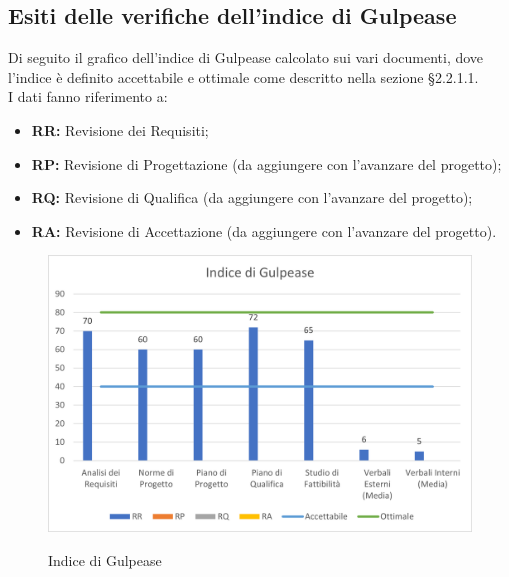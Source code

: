 \subsection{Esiti delle verifiche dell'indice di Gulpease}
Di seguito il grafico dell'indice di Gulpease calcolato sui vari documenti, dove l'indice è definito accettabile e ottimale come descritto nella sezione §2.2.1.1.\\
I dati fanno riferimento a:
\begin{itemize}
	\item \textbf{RR:} Revisione dei Requisiti;
	\item \textbf{RP:} Revisione di Progettazione (da aggiungere con l'avanzare del progetto);
	\item \textbf{RQ:} Revisione di Qualifica (da aggiungere con l'avanzare del progetto);
	\item \textbf{RA:} Revisione di Accettazione (da aggiungere con l'avanzare del progetto).
\end{itemize} 

\begin{figure}[H]
\centering
\includegraphics[scale=0.90]{res/ResocontoAttivitaDiVerifica/res/img/indiceGulpease.png}\\
\caption{Indice di Gulpease}
\end{figure}

